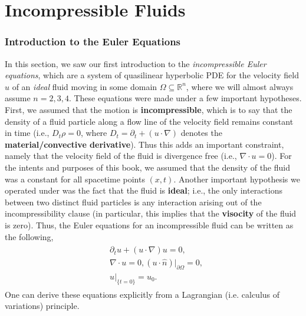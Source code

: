 \documentclass{article}
\begin{document}
	\part{Incompressible Fluids} 
	\section{Introduction to the Euler Equations} 
	In this section, we saw our first introduction to the \textit{incompressible Euler equations}, which are a system of quasilinear hyperbolic PDE for the velocity field $u$ of an \textit{ideal} fluid moving in some domain $\Omega \subseteq \mathbb{R}^{n}$, where we will almost always assume $n = 2, 3, 4$. These equations were made under a few important hypotheses. First, we assumed that the motion is \textbf{incompressible}, which is to say that the density of a fluid particle along a flow line of the velocity field remains constant in time (i.e., $D_{t}\rho = 0$, where $D_{t} = \partial_{t} + (u \cdot \nabla)$ denotes the \textbf{material/convective derivative}). Thus this adds an important constraint, namely that the velocity field of the fluid is divergence free (i.e., $\nabla \cdot u = 0$). For the intents and purposes of this book, we assumed that the density of the fluid was a constant for all spacetime points $(x, t)$. Another important hypothesis we operated under was the fact that the fluid is \textbf{ideal}; i.e., the only interactions between two distinct fluid particles is any interaction arising out of the incompressibility clause (in particular, this implies that the \textbf{visocity} of the fluid is zero). Thus, the Euler equations for an incompressible fluid can be written as the following, 
	\begin{align*}
		\begin{split}
			&\partial_{t}u + (u \cdot \nabla)u = 0, \\
			&\nabla \cdot u = 0, (u \cdot \hat{n})|_{\partial \Omega} = 0, \\
			&u|_{\{t = 0\}} = u_{0}. 
		\end{split} 
	\end{align*} 
	One can derive these equations explicitly from a Lagrangian (i.e. calculus of variations) principle. 
	
\end{document}
